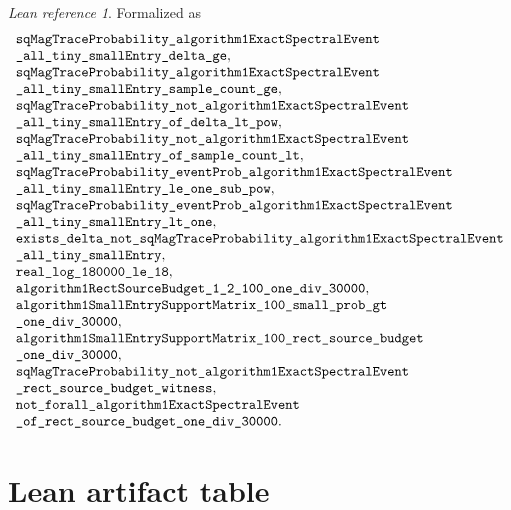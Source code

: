 \documentclass[11pt]{article}
\newcommand{\lean}[1]{\texttt{\detokenize{#1}}}
\theoremstyle{definition}
\theoremstyle{remark}
\newtheorem*{leanref}{Lean reference}
\begin{document}
\begin{leanref}
Formalized as
\[
\begin{array}{l}
  \lean{sqMagTraceProbability_algorithm1ExactSpectralEvent}\\
  \lean{_all_tiny_smallEntry_delta_ge},\\
  \lean{sqMagTraceProbability_algorithm1ExactSpectralEvent}\\
  \lean{_all_tiny_smallEntry_sample_count_ge},\\
  \lean{sqMagTraceProbability_not_algorithm1ExactSpectralEvent}\\
  \lean{_all_tiny_smallEntry_of_delta_lt_pow},\\
  \lean{sqMagTraceProbability_not_algorithm1ExactSpectralEvent}\\
  \lean{_all_tiny_smallEntry_of_sample_count_lt},\\
  \lean{sqMagTraceProbability_eventProb_algorithm1ExactSpectralEvent}\\
  \lean{_all_tiny_smallEntry_le_one_sub_pow},\\
  \lean{sqMagTraceProbability_eventProb_algorithm1ExactSpectralEvent}\\
  \lean{_all_tiny_smallEntry_lt_one},\\
  \lean{exists_delta_not_sqMagTraceProbability_algorithm1ExactSpectralEvent}\\
  \lean{_all_tiny_smallEntry},\\
  \lean{real_log_180000_le_18},\\
  \lean{algorithm1RectSourceBudget_1_2_100_one_div_30000},\\
  \lean{algorithm1SmallEntrySupportMatrix_100_small_prob_gt}\\
  \lean{_one_div_30000},\\
  \lean{algorithm1SmallEntrySupportMatrix_100_rect_source_budget}\\
  \lean{_one_div_30000},\\
  \lean{sqMagTraceProbability_not_algorithm1ExactSpectralEvent}\\
  \lean{_rect_source_budget_witness},\\
  \lean{not_forall_algorithm1ExactSpectralEvent}\\
  \lean{_of_rect_source_budget_one_div_30000}.
\end{array}
\]
\end{leanref}

\section*{Lean artifact table}
\end{document}
